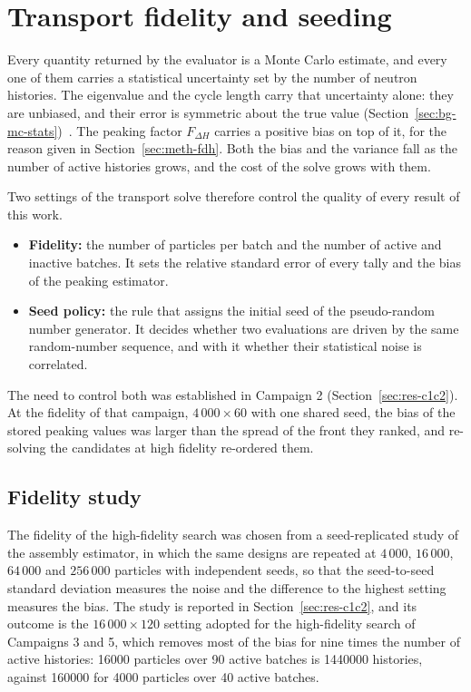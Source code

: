 \section{Transport fidelity and seeding}
\label{sec:meth-fidelity}

Every quantity returned by the evaluator is a Monte Carlo estimate,
and every one of them carries a statistical uncertainty set by the
number of neutron histories. The eigenvalue and the cycle length carry
that uncertainty alone: they are unbiased, and their error is
symmetric about the true value
(Section~\ref{sec:bg-mc-stats})~\cite{lux_koblinger_1991}. The peaking
factor $F_{\Delta H}$ carries a positive bias on top of it, for the
reason given in Section~\ref{sec:meth-fdh}. Both the bias and the
variance fall as the number of active histories grows, and the cost of
the solve grows with them.

Two settings of the transport solve therefore control the quality of
every result of this work.

\begin{itemize}
  \item \textbf{Fidelity:} the number of particles per batch and the
        number of active and inactive batches. It sets the relative
        standard error of every tally and the bias of the peaking
        estimator.

  \item \textbf{Seed policy:} the rule that assigns the initial seed of
        the pseudo-random number generator. It decides whether two
        evaluations are driven by the same random-number sequence, and
        with it whether their statistical noise is correlated.
\end{itemize}

The need to control both was established in Campaign 2
(Section~\ref{sec:res-c1c2}). At the fidelity of that campaign,
$4\,000\times60$ with one shared seed, the bias of the stored peaking
values was larger than the spread of the front they ranked, and
re-solving the candidates at high fidelity re-ordered them.

\subsection{Fidelity study}
\label{sec:meth-fid-ladder}

The fidelity of the high-fidelity search was chosen from a
seed-replicated study of the assembly estimator, in which the same
designs are repeated at $4\,000$, $16\,000$, $64\,000$ and
$256\,000$ particles with independent seeds, so that the
seed-to-seed standard deviation measures the noise and the difference
to the highest setting measures the bias. The study is reported in
Section~\ref{sec:res-c1c2}, and its outcome is the
$16\,000\times120$ setting adopted for the high-fidelity search of
Campaigns 3 and 5, which removes most of the bias for nine times the
number of active histories: \num{16000} particles over 90 active
batches is \num{1440000} histories, against \num{160000} for
\num{4000} particles over 40 active batches.

